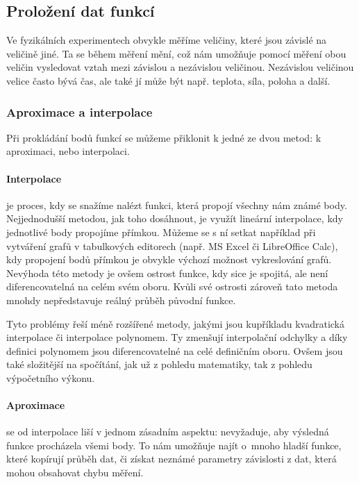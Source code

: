 \newcommand{\nsum}{\sum^n_{i=1}}
\newcommand{\nsumx}{\sum^n_{i=1}x_i}
\newcommand{\nsumy}{\sum^n_{i=1}y_i}
\newcommand{\nsumxx}{\sum^n_{i=1}x_i^2}
\newcommand{\nsumxy}{\sum^n_{i=1}x_iy_i}

\subsection{Proložení dat funkcí}
Ve fyzikálních experimentech obvykle měříme veličiny, které jsou závislé na
veličině jiné. Ta se během měření mění, což nám umožňuje pomocí měření obou
veličin vysledovat vztah mezi závislou a nezávislou veličinou. Nezávislou
veličinou velice často bývá čas, ale také jí může být např. teplota, síla,
poloha a další.\cite{praktikum}

\subsubsection{Aproximace a interpolace}
Při prokládání bodů funkcí se můžeme přiklonit k jedné ze dvou metod: k
aproximaci, nebo interpolaci.

\paragraph{Interpolace} je proces, kdy se snažíme nalézt funkci, která propojí
všechny nám známé body. Nejjednodušší metodou, jak toho dosáhnout, je využít
lineární interpolace, kdy jednotlivé body propojíme přímkou. Můžeme se s ní
setkat například při vytváření grafů v tabulkových editorech (např. MS Excel či
LibreOffice Calc), kdy propojení bodů přímkou je obvykle výchozí možnost
vykreslování grafů. Nevýhoda této metody je ovšem ostrost funkce, kdy sice je
spojitá, ale není diferencovatelná na celém svém oboru. Kvůli své ostrosti
zároveň tato metoda mnohdy nepředstavuje reálný průběh původní funkce.

Tyto problémy řeší méně rozšířené metody, jakými jsou kupříkladu kvadratická
interpolace či interpolace polynomem. Ty zmenšují interpolační odchylky a díky
definici polynomem jsou diferencovatelné na celé definičním oboru. Ovšem jsou
také složitější na spočítání, jak už z pohledu matematiky, tak z pohledu
výpočetního výkonu.

\paragraph{Aproximace} se od interpolace liší v jednom zásadním aspektu:
nevyžaduje, aby výsledná funkce procházela všemi body. To nám umožňuje najít
o~mnoho hladší funkce, které kopírují průběh dat, či získat neznámé parametry
závislosti z dat, která mohou obsahovat chybu měření. 

